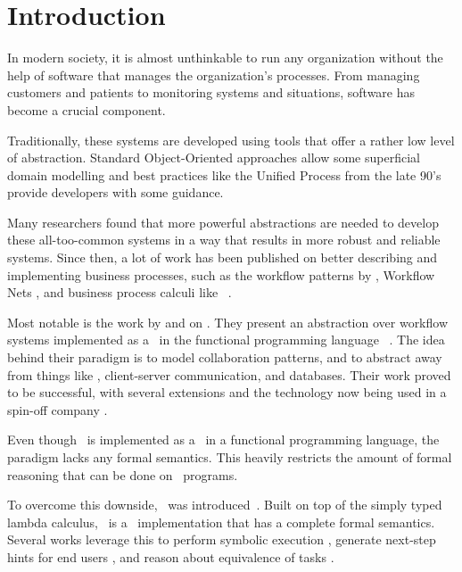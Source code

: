 
\section{Introduction}
\label{sec:introduction}

In modern society, it is almost unthinkable to run any organization without the help of software that manages the organization's processes.
From managing customers and patients to monitoring systems and situations, software has become a crucial component.

Traditionally, these systems are developed using tools that offer a rather low level of abstraction.
Standard Object-Oriented approaches allow some superficial domain modelling and best practices like the Unified Process from the late 90's provide developers with some guidance.

Many researchers found that more powerful abstractions are needed to develop these all-too-common systems in a way that results in more robust and reliable systems.
Since then, a lot of work has been published on better describing and implementing business processes, such as the workflow patterns by \citeauthor{journals/dpd/AalstHKB03}, Workflow Nets \cite{journals/jcsc/Aalst98}, and business process calculi like \BPEL\ \cite{bpel}.

Most notable is the work by \citet{conf/ifl/KoopmanPA08} and \citet{conf/ppdp/PlasmeijerLMAK12} on \ITASKS.
They present an abstraction over workflow systems implemented as a \DSL\ in the functional programming language \CLEAN\ \cite{plasmeijer2002clean}.
The idea behind their paradigm is to model collaboration patterns, and to abstract away from things like \GUI, client-server communication, and databases.
Their work proved to be successful, with several extensions and the technology now being used in a spin-off company \cite{com/tss/viia}.

Even though \ITASKS\ is implemented as a \DSL\ in a functional programming language, the paradigm lacks any formal semantics.
This heavily restricts the amount of formal reasoning that can be done on \ITASKS\ programs.

To overcome this downside, \TOPHAT\ was introduced~\cite{conf/ppdp/SteenvoordenNK19}.
Built on top of the simply typed lambda calculus,
\TOPHAT\ is a \TOP\ implementation that has a complete formal semantics.
Several works leverage this to perform symbolic execution \cite{conf/ifl/NausSK19},
generate next-step hints for end users \cite{conf/sfp/NausS20},
and reason about equivalence of tasks \cite{conf/sfp/KlijnsmaS22}.

